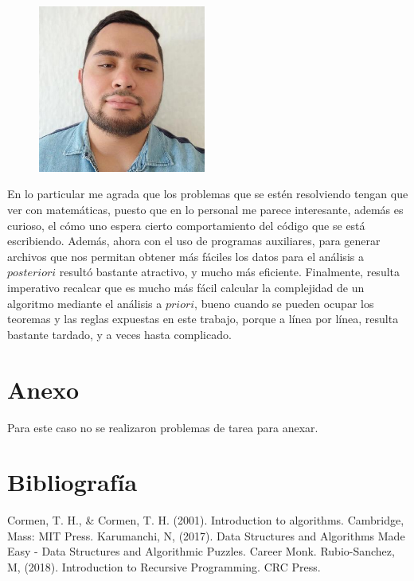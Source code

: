 \documentclass[12pt,twoside]{article}
\begin{document}
\begin{figure}
    \includegraphics[width=5.5cm]{me.jpg}
\end{figure} 
En lo particular me agrada que los problemas que se estén resolviendo tengan que ver con matemáticas, puesto que en lo personal me parece interesante, además es curioso, el cómo uno espera cierto comportamiento del código que se está escribiendo. Además, ahora con el uso de programas auxiliares, para generar archivos que nos permitan obtener más fáciles los datos para el análisis a $posteriori$ resultó bastante atractivo, y mucho más eficiente. Finalmente, resulta imperativo recalcar que es mucho más fácil calcular la complejidad de un algoritmo mediante el análisis a $priori$, bueno cuando se pueden ocupar los teoremas y las reglas expuestas en este trabajo, porque a línea por línea, resulta bastante tardado, y a veces hasta complicado.
\newpage
\section{Anexo}
Para este caso no se realizaron problemas de tarea para anexar.

\section{Bibliograf\'ia}

Cormen, T. H., \& Cormen, T. H. (2001). Introduction to algorithms. Cambridge, Mass: MIT Press.
\newline
Karumanchi, N, (2017). Data Structures and Algorithms Made Easy - Data Structures and Algorithmic Puzzles. Career Monk.
\newline
Rubio-Sanchez, M, (2018). Introduction to Recursive Programming. CRC Press.

\medskip
\end{document}
